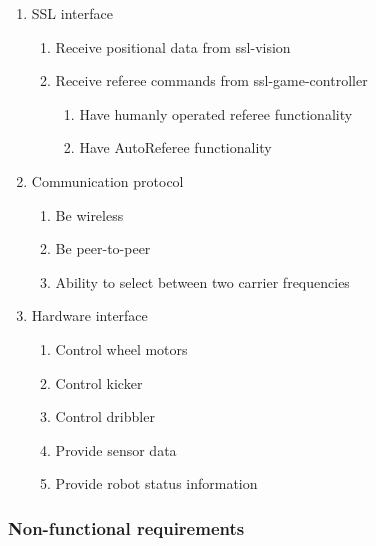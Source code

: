 \begin{enumerate}[label*=\arabic*.]
\begin{enumerate}[label*=\arabic*.]
        \item Send packages containing robot commands to grSim
    \end{enumerate}
    \item SSL interface
    \begin{enumerate}[label*=\arabic*.]
        \item Receive positional data from ssl-vision
        \item Receive referee commands from ssl-game-controller
        \begin{enumerate}[label*=\arabic*.]
            \item Have humanly operated referee functionality
            \item Have AutoReferee functionality
        \end{enumerate} 
    \end{enumerate}
    \item Communication protocol
    \begin{enumerate}[label*=\arabic*.]
        \item Be wireless
        \item Be peer-to-peer
        \item Ability to select between two carrier frequencies
    \end{enumerate}
    \item Hardware interface
    \begin{enumerate}[label*=\arabic*.]
        \item Control wheel motors
        \item Control kicker
        \item Control dribbler
        \item Provide sensor data
        \item Provide robot status information
    \end{enumerate}
\end{enumerate}



\subsubsection{Non-functional requirements}

